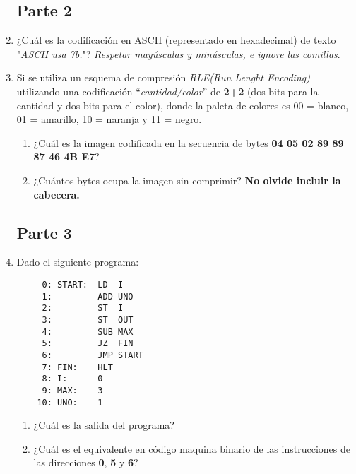 \documentclass[12pt]{article}
\begin{document}
\begin{enumerate}
\subsection*{Parte 2}

    \item ¿Cuál es la codificación en ASCII (representado en hexadecimal) de
        texto "\emph{ASCII usa 7b.}"? \emph{Respetar mayúsculas y
        minúsculas, e ignore las comillas}.

    \item Si se utiliza un esquema de compresión \emph{RLE(Run Lenght
        Encoding)} utilizando una codificación ``\emph{cantidad/color}'' de
        \textbf{2+2} (dos bits para la cantidad y dos bits para el color),
        donde la paleta de colores es 00 = blanco, 01 = amarillo, 10 = naranja
        y 11 = negro.

        \begin{enumerate}

            \item ¿Cuál es la imagen codificada en la secuencia de bytes
                \textbf{04 05 02 89 89 87 46 4B E7}?

            \item ¿Cuántos bytes ocupa la imagen sin comprimir? \textbf{No
                olvide incluir la cabecera.}

        \end{enumerate}


\subsection*{Parte 3}

    \item Dado el siguiente programa:

        \begin{verbatim}
     0: START:  LD  I
     1:         ADD UNO
     2:         ST  I
     3:         ST  OUT
     4:         SUB MAX
     5:         JZ  FIN
     6:         JMP START
     7: FIN:    HLT
     8: I:      0
     9: MAX:    3
    10: UNO:    1
        \end{verbatim}

        \begin{enumerate}

            \item ¿Cuál es la salida del programa?

            \item ¿Cuál es el equivalente en código maquina binario de las
                instrucciones de las direcciones \textbf{0}, \textbf{5} y
                \textbf{6}?


\end{enumerate}
\end{enumerate}
\end{document}
